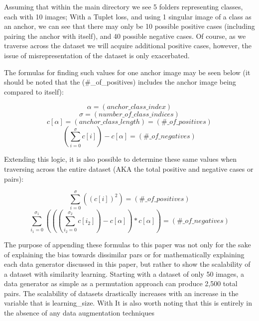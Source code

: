 \documentclass[
	letterpaper, %
	10pt, %
	unnumberedsections, %
	twoside, %
]{LTJournalArticle}
\begin{document}
Assuming that within the main directory we see 5 folders representing classes, each with 10 images; With a Tuplet loss, and using 1 singular image of a class as an anchor, we can see that there may only be 10 possible positive cases (including pairing the anchor with itself), and 40 possible negative cases. Of course, as we traverse across the dataset we will acquire additional positive cases, however, the issue of misrepresentation of the dataset is only exacerbated.  

The formulas for finding such values for one anchor image may be seen below (it should be noted that the (\#\_of\_positives) includes the anchor image being compared to itself):

\[ \alpha = (anchor\_class\_index) \]
\[ \sigma  = (number\_of\_class\_indices) \]
\[ c[\alpha] = (anchor\_class\_length) = (\#\_of\_positives) \]
\[ (\sum_{i = 0}^\sigma c[i]) - c[\alpha]= (\#\_of\_negatives) \]

Extending this logic, it is also possible to determine these same values when traversing across the entire dataset (AKA the total positive and negative cases or pairs):

\[ \sum_{i = 0}^\sigma ((c[i])^2) = (\#\_of\_positives) \]
\[ \sum_{i_1 = 0}^{\sigma_1}(((\sum_{i_2 = 0}^{\sigma_2} c[i_2]) - c[\alpha]) * c[\alpha]) = (\#\_of\_negatives) \]


The purpose of appending these formulas to this paper was not only for the sake of explaining the bias towards dissimilar pars or for mathematically explaining each data generator discussed in this paper, but rather to show the scalability of a dataset with similarity learning. Starting with a dataset of only 50 images, a data generator as simple as a permutation approach can produce 2,500 total pairs.
The scalability of datasets drastically increases with an increase in the variable that is learning\_size. With 
It is also worth noting that this is entirely in the absence of any data augmentation techniques
\end{document}
